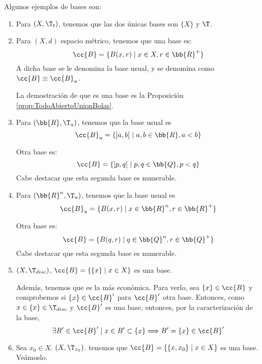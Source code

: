 \begin{ejemplo}
    Algunos ejemplos de bases son:
    \begin{enumerate}
        \item Para $(X,\T_t)$, tenemos que las dos únicas bases son $\{X\}$ y $\T$.

        \item Para $(X,d)$ espacio métrico, tenemos que una base es:
        \begin{equation*}
            \cc{B}=\{B(x,r)\mid x\in X,r\in \bb{R}^+\}
        \end{equation*}
        A dicha base se le denomina la base usual, y se denomina como $\cc{B}\equiv\cc{B}_u$.

        La demostración de que es una base es la Proposición \ref{prop:TodoAbiertoUnionBolas}.

        \item Para $(\bb{R},\T_u)$, tenemos que la base usual es $$\cc{B}_u=\{]a,b[~\mid a,b\in \bb{R}, a<b\}$$

        Otra base es:
        \begin{equation*}
            \cc{B}=\{]p,q[~\mid p,q\in \bb{Q},p<q\}
        \end{equation*}
        Cabe destacar que esta segunda base es numerable.

        \item Para $(\bb{R}^n,\T_u)$, tenemos que la base usual es $$\cc{B}_u=\{B(x,r)\mid x\in \bb{R}^n, r\in \bb{R}^+\}$$

        Otra base es:
        \begin{equation*}
            \cc{B}=\{B(q,r)\mid q\in \bb{Q}^n, r\in \bb{Q}^+\}
        \end{equation*}
        Cabe destacar que esta segunda base es numerable.

        \item $(X,\T_{disc})$, $\cc{B}=\left\{\{x\}\mid x\in X\right\}$ es una base.
        
        Además, tenemos que es la más económica. Para verlo, sea $\{x\}\in \cc{B}$ y comprobemos si $\{x\}\in \cc{B}'$ para $\cc{B}'$ otra base. Entonces, como $x\in \{x\}\in \T_{disc}$ y $\cc{B}'$ es una base, entonces, por la caracterización de la base,
        $$\exists B'\in \cc{B}'\mid x\in B'\subset \{x\}\Longrightarrow B'=\{x\}\in \cc{B}'$$
        
        \item Sea $x_0\in X$. $(X,\T_{x_0})$. tenemos que $\cc{B}=\left\{\{x,x_0\}\mid x\in X\right\}$ es una base. Veámoslo.


\end{enumerate}
\end{ejemplo}
